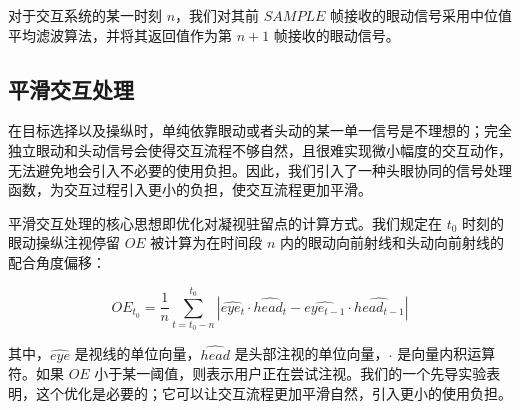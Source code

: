 对于交互系统的某一时刻 $n$，我们对其前 $SAMPLE$ 帧接收的眼动信号采用中位值平均滤波算法，并将其返回值作为第 $n + 1$ 帧接收的眼动信号。

\subsection{平滑交互处理}

在目标选择以及操纵时，单纯依靠眼动或者头动的某一单一信号是不理想的；完全独立眼动和头动信号会使得交互流程不够自然，且很难实现微小幅度的交互动作，无法避免地会引入不必要的使用负担。因此，我们引入了一种头眼协同的信号处理函数，为交互过程引入更小的负担，使交互流程更加平滑。

平滑交互处理的核心思想即优化对凝视驻留点的计算方式。我们规定在 $t_0$ 时刻的眼动操纵注视停留 $OE$ 被计算为在时间段 $n$ 内的眼动向前射线和头动向前射线的配合角度偏移：

\begin{equation}
	\label{formula-3-8}
	OE_{t_0} = \frac{1}{n} \sum_{t=t_0-n}^{t_0} \left| \hat{eye_t} \cdot \hat{head_t} - \hat{eye_{t-1}} \cdot \hat{head_{t-1}} \right|
\end{equation}

其中，$\hat{eye}$ 是视线的单位向量，$\hat{head}$ 是头部注视的单位向量，$\cdot$ 是向量内积运算符。如果 $OE$ 小于某一阈值，则表示用户正在尝试注视。我们的一个先导实验表明，这个优化是必要的；它可以让交互流程更加平滑自然，引入更小的使用负担。